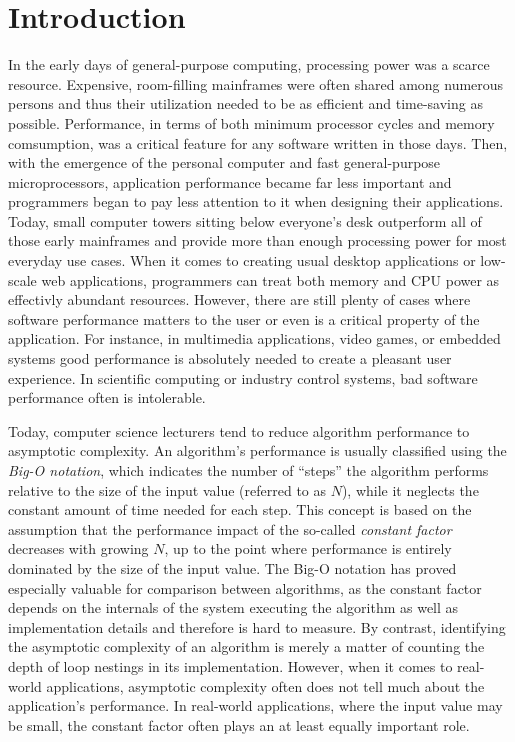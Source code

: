 \section{Introduction}
In the early days of general-purpose computing, processing power was a scarce resource. Expensive, room-filling mainframes were often shared among numerous persons and thus their utilization needed to be as efficient and time-saving as possible.   Performance, in terms of both minimum processor cycles and memory comsumption, was a critical feature for any software written in those days. Then, with the emergence of the personal computer and fast general-purpose microprocessors, application performance became far less important and programmers began to pay less attention to it when designing their applications. Today, small computer towers sitting below everyone's desk outperform all of those early mainframes and provide more than enough processing power for most everyday use cases. When it comes to creating usual desktop applications or low-scale web applications, programmers can treat both memory and CPU power as effectivly abundant resources. However, there are still plenty of cases where software performance matters to the user or even is a critical property of the application. For instance, in multimedia applications, video games, or embedded systems good performance is absolutely needed to create a pleasant user experience. In scientific computing or industry control systems, bad software performance often is intolerable.

Today, computer science lecturers tend to reduce algorithm performance to asymptotic complexity. An algorithm's performance is usually classified using the \emph{Big-O notation}, which indicates the number of ``steps'' the algorithm performs relative to the size of the input value (referred to as $N$), while it neglects the constant amount of time needed for each step. This concept is based on the assumption that the performance impact of the so-called \emph{constant factor} decreases with growing $N$, up to the point where performance is entirely dominated by the size of the input value. The Big-O notation has proved especially valuable for comparison between algorithms, as the constant factor depends on the internals of the system executing the algorithm as well as implementation details and therefore is hard to measure. By contrast, identifying the asymptotic complexity of an algorithm is merely a matter of counting the depth of loop nestings in its implementation. However, when it comes to real-world applications, asymptotic complexity often does not tell much about the application's performance. In real-world applications, where the input value may be small, the constant factor often plays an at least equally important role.

